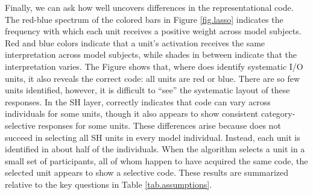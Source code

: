 Finally, we can ask how well {\lasso} uncovers differences in the representational code. The red-blue spectrum of the colored bars in Figure \ref{fig.lasso} indicates the frequency with which each unit receives a positive weight across model subjects. Red and blue colors indicate that a unit's activation receives the same interpretation across model subjects, while shades in between indicate that the interpretation varies. The Figure shows that, where {\lasso} does identify systematic I/O units, it also reveals the correct code: all units are red or blue. There are so few units identified, however, it is difficult to ``see'' the systematic layout of these responses. In the SH layer, {\lasso} correctly indicates that code can vary across individuals for some units, though it also appears to show consistent category-selective responses for some units. These differences arise because {\lasso} does not succeed in selecting all SH units in every model individual. Instead, each unit is identified in about half of the individuals. When the algorithm selects a unit in a small set of participants, all of whom happen to have acquired the same code, the selected unit appears to show a selective code. These results are summarized relative to the key questions in Table \ref{tab.assumptions}.


